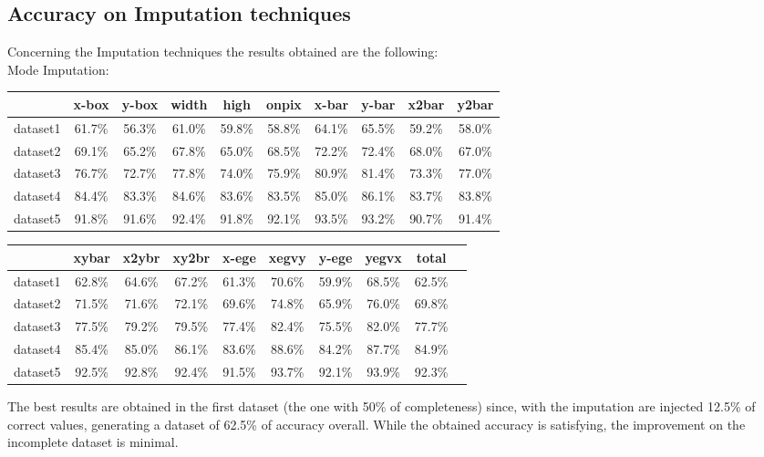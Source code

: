 \documentclass{article}
\begin{document}
\subsection*{Accuracy on Imputation techniques}
Concerning the Imputation techniques the results obtained are the following:\\
Mode Imputation:
\begin{center}
    \begin{table}[H]
\begin{tabular}{|c|c|c|c|c|c|c|c|c|c|}
\hline
 & x-box & y-box & width & high & onpix & x-bar & y-bar & x2bar & y2bar \\ \hline
dataset1 & 61.7\% & 56.3\% & 61.0\% & 59.8\% & 58.8\% & 64.1\% & 65.5\% & 59.2\% & 58.0\% \\ \hline
dataset2 & 69.1\% & 65.2\% & 67.8\% & 65.0\% & 68.5\% & 72.2\% & 72.4\% & 68.0\% & 67.0\% \\ \hline
dataset3 & 76.7\% & 72.7\% & 77.8\% & 74.0\% & 75.9\% & 80.9\% & 81.4\% & 73.3\% & 77.0\% \\ \hline
dataset4 & 84.4\% & 83.3\% & 84.6\% & 83.6\% & 83.5\% & 85.0\% & 86.1\% & 83.7\% & 83.8\% \\ \hline
dataset5 & 91.8\% & 91.6\% & 92.4\% & 91.8\% & 92.1\% & 93.5\% & 93.2\% & 90.7\% & 91.4\% \\ \hline
\end{tabular}
\end{table}
\begin{table}[H]
\begin{tabular}{|c|c|c|c|c|c|c|c|c|c|}
\hline
 & xybar & x2ybr & xy2br & x-ege & xegvy & y-ege & yegvx & total \\ \hline
dataset1 & 62.8\% & 64.6\% & 67.2\% & 61.3\% & 70.6\% & 59.9\% & 68.5\% & 62.5\% \\ \hline
dataset2 & 71.5\% & 71.6\% & 72.1\% & 69.6\% & 74.8\% & 65.9\% & 76.0\% & 69.8\% \\ \hline
dataset3 & 77.5\% & 79.2\% & 79.5\% & 77.4\% & 82.4\% & 75.5\% & 82.0\% & 77.7\% \\ \hline
dataset4 & 85.4\% & 85.0\% & 86.1\% & 83.6\% & 88.6\% & 84.2\% & 87.7\% & 84.9\% \\ \hline
dataset5 & 92.5\% & 92.8\% & 92.4\% & 91.5\% & 93.7\% & 92.1\% & 93.9\% & 92.3\% \\ \hline
\end{tabular}
\end{table}
\end{center}
The best results are obtained in the first dataset (the one with 50\% of completeness) since, with the imputation are injected 12.5\% of correct values, generating a dataset of 62.5\% of accuracy overall. While the obtained accuracy is satisfying, the improvement on the incomplete dataset is minimal.\\\\
\end{document}
